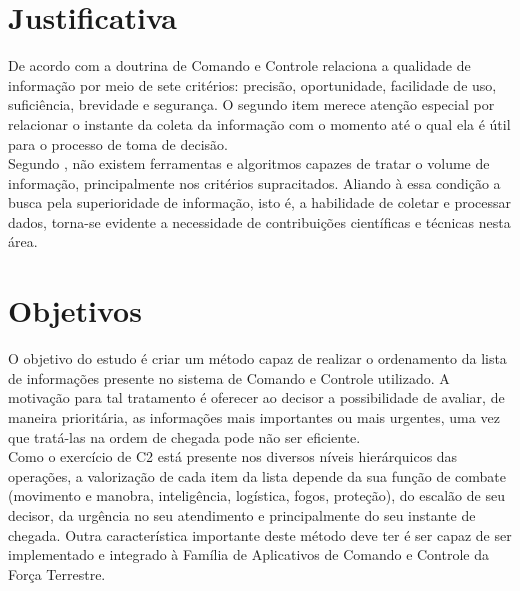\documentclass[a4paper,12pt]{article}
\begin{document}
\section{Justificativa}
De acordo com a doutrina de Comando e Controle relaciona a qualidade de informação por meio de sete critérios: precisão, oportunidade, facilidade de uso,
suficiência, brevidade e segurança. O segundo item merece atenção especial por relacionar o instante da coleta da informação com o momento até o qual ela é 
útil para o processo de toma de decisão.\\
\indent Segundo \cite{Savas 2014}, não existem ferramentas e algoritmos capazes de tratar o volume de informação, principalmente nos critérios supracitados. Aliando à
essa condição a busca pela superioridade de informação, isto é, a habilidade de coletar e processar dados, torna-se evidente a necessidade de
contribuições científicas e técnicas nesta área.

\section{Objetivos}
\indent O objetivo do estudo é criar um método capaz de realizar o ordenamento da lista de informações presente no sistema de 
Comando e Controle utilizado. A motivação para tal tratamento é oferecer ao decisor a possibilidade de avaliar, de maneira 
prioritária, as informações mais importantes ou mais urgentes, uma vez que tratá-las na ordem de chegada pode não ser 
eficiente.\\
\indent Como o exercício de C2 está presente nos diversos níveis hierárquicos das operações, a valorização de cada item 
da lista depende da sua função de combate (movimento e manobra, inteligência, logística, fogos, proteção), do escalão de 
seu decisor, da urgência no seu atendimento e principalmente do seu instante de chegada. Outra característica importante 
deste método deve ter é ser capaz de ser implementado e integrado à Família de Aplicativos de Comando e Controle da 
Força Terrestre.\\
\end{document}
